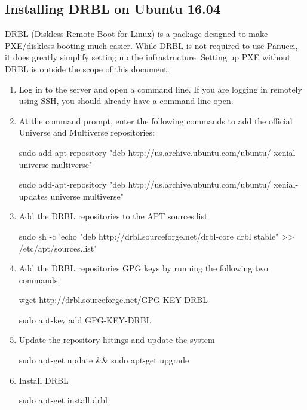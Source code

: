 \documentclass{article}
\begin{document}
\begin{flushleft}
\subsection{Installing DRBL on Ubuntu 16.04}
DRBL (Diskless Remote Boot for Linux) is a package designed to make PXE/diskless booting much easier.  While DRBL is not required to use Panucci, it does greatly simplify setting up the infrastructure.  Setting up PXE without DRBL is outside the scope of this document.
\begin{enumerate}
  \item Log in to the server and open a command line.  If you are logging in remotely using SSH, you should already have a command line open.
  \item At the command prompt, enter the following commands to add the official Universe and Multiverse repositories:
  \begin{spverbatim}
sudo add-apt-repository "deb http://us.archive.ubuntu.com/ubuntu/ xenial universe multiverse"
  \end{spverbatim}
  \begin{spverbatim}
sudo add-apt-repository "deb http://us.archive.ubuntu.com/ubuntu/ xenial-updates universe multiverse"
  \end{spverbatim}
\item Add the DRBL repositories to the APT sources.list
  \begin{spverbatim}
sudo sh -c 'echo "deb http://drbl.sourceforge.net/drbl-core drbl stable" >> /etc/apt/sources.list'
  \end{spverbatim}
\item Add the DRBL repositories GPG keys by running the following two commands:
  \begin{spverbatim}
wget http://drbl.sourceforge.net/GPG-KEY-DRBL
  \end{spverbatim}
  \begin{spverbatim}
sudo apt-key add GPG-KEY-DRBL
  \end{spverbatim}
\item Update the repository listings and update the system
  \begin{spverbatim}
sudo apt-get update && sudo apt-get upgrade
  \end{spverbatim}
\item Install DRBL
  \begin{spverbatim}
sudo apt-get install drbl
  \end{spverbatim}
\end{enumerate}

\end{flushleft}
\end{document}
